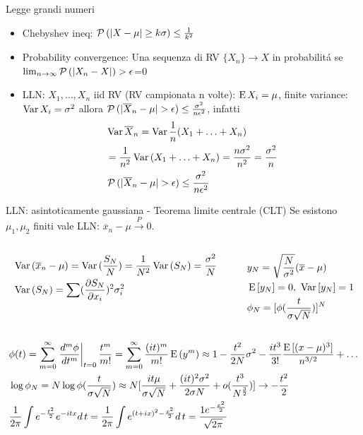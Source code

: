 \documentclass[asd-beamer.tex]{subfiles}
\begin{document}
\begin{frame}{Legge grandi numeri}
\begin{itemize}
\item Chebyshev ineq: $\prob{(|X-\mu|\geq k\sigma)}\leq\frac{1}{k^2}$
\item Probability convergence: 	Una sequenza di RV $\{X_n\}\to X$ in probabilit\'a se $\lim_{n\to\infty}\prob{(|X_n-X|)>\epsilon}$=0
\item LLN: $X_1,\ldots,X_n$ iid RV (RV campionata n volte): $\E{X_i}=\mu$, finite variance: $\var{X_i}=\sigma^2$ allora $\prob{(|\overline{X}_n-\mu|>\epsilon)}\leq\frac{\sigma^2}{n\epsilon^2}$, infatti
\begin{align*}
&\var{\overline{X}_n}=\var{\frac{1}{n}(X_1+\ldots+X_n)}\\
&=\frac{1}{n^2}\var{(X_1+\ldots+X_n)}=\frac{n\sigma^2}{n^2}=\frac{\sigma^2}{n}\\
&\prob{(|\overline{X}_n-\mu|>\epsilon)}\leq\frac{\sigma^2}{n\epsilon^2}
\end{align*}
\end{itemize}
\end{frame}

\begin{frame}{LLN: asintoticamente gaussiana - Teorema limite centrale (CLT)}
Se esistono $\mu_1, \mu_2$ finiti vale LLN: $\overline{x}_n-\mu\xrightarrow{P}0$.
\begin{columns}[T]
	\begin{column}{0.5\textwidth}
		\begin{align*}
		&\var{(\overline{x}_n-\mu)}=\var{(\frac{S_N}{N})}=\frac{1}{N^2}\var{(S_N)}=\frac{\sigma^2}{N}\\
		&\var{(S_N)}=\sum(\PDy{x_i}{S_N})^2\sigma_i^2
		\end{align*}
	\end{column}
	\begin{column}{0.5\textwidth}
		\begin{align*}
		&y_N=\sqrt{\frac{N}{\sigma^2}}(\overline{x}-\mu)\\
		&\E{[y_N]}=0,\ \var{[y_N]}=1\\
		&\phi_N=[\phi(\frac{t}{\sigma\sqrt{N}})]^N
		\end{align*}
	\end{column}
\end{columns}
\begin{align*}
&\phi(t)=\sum_{m=0}^{\infty}\left.\frac{d^m\phi}{dt^m}\right|_{t=0}\frac{t^m}{m!}=\sum_{m=0}^{\infty}\frac{(it)^m}{m!}\E{(y^m)}\approx1-\frac{t^2}{2N}\sigma^2-\frac{it^3}{3!}\frac{\E{[(x-\mu)^3]}}{n\expy{3/2}}+\ldots\\
&\log{\phi_N}=N\log{\phi(\frac{t}{\sigma\sqrt{N}})}\approx N[\frac{it\mu}{\sigma\sqrt{N}}+\frac{(it)^2\sigma^2}{2\sigma N}+o(\frac{t^3}{N\expy{\frac{3}{2}}})]\to-\frac{t^2}{2}\\
&\frac{1}{2\pi}\int\exp{-\frac{t^2}{2}}\exp{-itx}d\,t=\frac{1}{2\pi}\int\exp{(t+ix)^2-\frac{x^2}{2}}d\,t=\frac{1\exp{-\frac{x^2}{2}}}{\sqrt{2\pi}}
\end{align*}
\end{frame}
\end{document}
